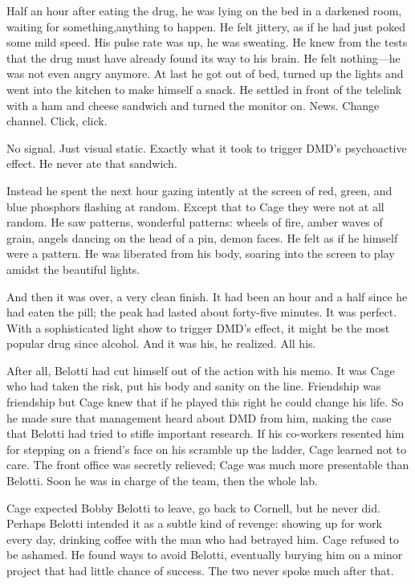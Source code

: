 Half an hour after eating the drug, he was lying on the bed in a darkened room, waiting for something,anything to happen. He felt jittery, as if he had just poked some mild speed. His pulse rate was up, he was sweating. He knew from the tests that the drug must have already found its way to his brain. He felt nothing---he was not even angry anymore. At last he got out of bed, turned up the lights and went into the kitchen to make himself a snack. He settled in front of the telelink with a ham and cheese sandwich and turned the monitor on. News. Change channel. Click, click.

No signal. Just visual static. Exactly what it took to trigger DMD's psychoactive effect. He never ate that sandwich.

Instead he spent the next hour gazing intently at the screen of red, green, and blue phosphors flashing at random. Except that to Cage they were not at all random. He saw patterns, wonderful patterns: wheels of fire, amber waves of grain, angels dancing on the head of a pin, demon faces. He felt as if he himself were a pattern. He was liberated from his body, soaring into the screen to play amidst the beautiful lights.

And then it was over, a very clean finish. It had been an hour and a half since he had eaten the pill; the peak had lasted about forty-five minutes. It was perfect. With a sophisticated light show to trigger DMD's effect, it might be the most popular drug since alcohol. And it was his, he realized. All his.

After all, Belotti had cut himself out of the action with his memo. It was Cage who had taken the risk, put his body and sanity on the line. Friendship was friendship but Cage knew that if he played this right he could change his life. So he made sure that management heard about DMD from him, making the case that Belotti had tried to stifle important research. If his co-workers resented him for stepping on a friend's face on his scramble up the ladder, Cage learned not to care. The front office was secretly relieved; Cage was much more presentable than Belotti. Soon he was in charge of the team, then the whole lab.

Cage expected Bobby Belotti to leave, go back to Cornell, but he never did. Perhaps Belotti intended it as a subtle kind of revenge: showing up for work every day, drinking coffee with the man who had betrayed him. Cage refused to be ashamed. He found ways to avoid Belotti, eventually burying him on a minor project that had little chance of success. The two never spoke much after that.

